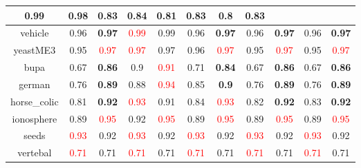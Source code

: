 \documentclass{article}%
\begin{document}
\begin{tabular}{c|cccccccccc}
{0.99
}&0.98&0.83&\textbf{0.84}&0.81&\textbf{0.83}&0.8&\textbf{0.83}\\%
\hline%
vehicle&0.96&\textbf{0.97}&\textcolor{red}{ 
0.99
}&0.99&0.96&\textbf{0.97}&0.96&\textbf{0.97}&0.96&\textbf{0.97}\\%
\hline%
yeastME3&0.95&\textcolor{red}{ 
0.97
}&\textcolor{red}{ 
0.97
}&0.97&0.96&\textcolor{red}{ 
0.97
}&0.95&\textcolor{red}{ 
0.97
}&0.95&\textcolor{red}{ 
0.97
}\\%
\hline%
bupa&0.67&\textbf{0.86}&0.9&\textcolor{red}{ 
0.91
}&0.71&\textbf{0.84}&0.67&\textbf{0.86}&0.67&\textbf{0.86}\\%
\hline%
german&0.76&\textbf{0.89}&0.88&\textcolor{red}{ 
0.94
}&0.85&\textbf{0.9}&0.76&\textbf{0.89}&0.76&\textbf{0.89}\\%
\hline%
horse\_colic&0.81&\textbf{0.92}&\textcolor{red}{ 
0.93
}&0.91&0.84&\textcolor{red}{ 
0.93
}&0.82&\textbf{0.92}&0.83&\textbf{0.92}\\%
\hline%
ionosphere&0.89&\textcolor{red}{ 
0.95
}&0.92&\textcolor{red}{ 
0.95
}&0.89&\textcolor{red}{ 
0.95
}&0.89&\textcolor{red}{ 
0.95
}&0.89&\textcolor{red}{ 
0.95
}\\%
\hline%
seeds&\textcolor{red}{ 
0.93
}&0.92&\textcolor{red}{ 
0.93
}&0.92&\textcolor{red}{ 
0.93
}&0.92&\textcolor{red}{ 
0.93
}&0.92&\textcolor{red}{ 
0.93
}&0.92\\%
\hline%
vertebal&\textcolor{red}{ 
0.71
}&0.71&\textcolor{red}{ 
0.71
}&0.71&\textcolor{red}{ 
0.71
}&0.71&\textcolor{red}{ 
0.71
}&0.71&\textcolor{red}{ 
0.71
}&0.71\\%
\hline%
\end{tabular}

%
\end{document}
